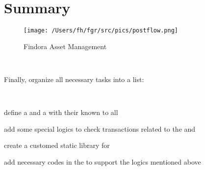 \clearpage

\section{Summary}

\begin{figure}[htbp]
    \centering
    \texttt{[image: /Users/fh/fgr/src/pics/postflow.png]}
    \caption{Findora Asset Management}
\end{figure}

~\par

Finally, organize all necessary tasks into a list:

~\par

\begin{ENUMERATE}
\item define a  and a  with their  known to all
    \item add some special logics to check transactions related to the  and 
    \item create a customed  static library for 
    \item add necessary codes in the  to support the logics mentioned above
\end{ENUMERATE}
